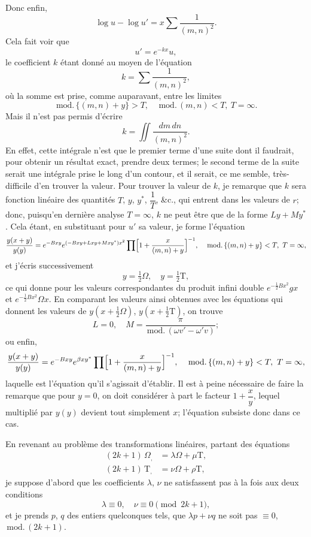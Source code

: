 \documentclass[11pt,a4paper]{article}
\providecommand{\md}{\,\mathrm{mod.}\,}
\begin{document}
Donc enfin,
\[
\log u - \log u' = x \sum \frac{1}{(m, n)^2}.
\]
Cela fait voir que
\[
u' = e^{-kx} u,
\]
le coefficient $k$ \'etant donn\'e au moyen de l'\'equation
\[
k = \sum \frac{1}{(m, n)^2},
\]
o\`u la somme est prise, comme auparavant, entre les limites
\[
\md\{(m, n) + y\} > T,\quad \md(m, n) < T,\ T = \infty.
\]
Mais il n'est pas permis d'\'ecrire
\[
k = \iint \frac{dm\,dn}{(m, n)^2}.
\]
En effet, cette int\'egrale n'est que le premier terme d'une suite dont il faudrait, pour obtenir un r\'esultat exact, prendre deux termes; le second terme de la suite serait une int\'egrale prise le long d'un contour, et il serait, ce me semble, tr\`es-difficile d'en trouver la valeur. Pour trouver la valeur de $k$, je remarque que $k$ sera fonction lin\'eaire des quantit\'es $T$, $y$, $y^*$, $\dfrac{1}{T}$, \&c., qui entrent dans les valeurs de $r$; donc, puisqu'en derni\`ere analyse $T = \infty$, $k$ ne peut \^etre que de la forme $L y + M y^*$. Cela \'etant, en substituant pour $u'$ sa valeur, je forme l'\'equation
\[
\frac{y(x + y)}{y(y)} = e^{-Bxy} e^{(-Bxy + Lxy + Mxy^*) x^2} \prod\Bigl[1 + \frac{x}{(m, n) + y}\Bigr]^{-1},\quad \md\{(m, n) + y\} < T,\ T = \infty,
\]
et j'\'ecris successivement
\[ y = \tfrac{1}{2}\Omega,\quad y = \tfrac{1}{2}\mathrm{T}, \]
ce qui donne pour les valeurs correspondantes du produit infini double $e^{-\frac{1}{2}Bx^2} g x$ et $e^{-\frac{1}{2}Bx^2} \Omega x$. En comparant les valeurs ainsi obtenues avec les \'equations qui donnent les valeurs de $y(x + \tfrac{1}{2}\Omega)$, $y(x + \tfrac{1}{2}\mathrm{T})$, on trouve
\[
L = 0,\quad M = \frac{\pi}{\md(\omega v' - \omega' v)};
\]
ou enfin,
\[
\frac{y(x + y)}{y(y)} = e^{-Bxy} e^{\beta x y^*} \prod\Bigl[1 + \frac{x}{(m, n) + y}\Bigr]^{-1},\quad \md\{(m, n) + y\} < T,\ T = \infty,
\]
laquelle est l'\'equation qu'il s'agissait d'\'etablir. Il est \`a peine n\'ecessaire de faire la remarque que pour $y = 0$, on doit consid\'erer \`a part le facteur $1 + \dfrac{x}{y}$, lequel multipli\'e par $y(y)$ devient tout simplement $x$; l'\'equation subsiste donc dans ce cas.

\medskip

En revenant au probl\`eme des transformations lin\'eaires, partant des \'equations
\begin{align*}
(2k+1)\,\Omega_{,} &= \lambda\Omega + \mu\mathrm{T},\\
(2k+1)\,\mathrm{T}_{,} &= \nu\Omega + \rho\mathrm{T},
\end{align*}
je suppose d'abord que les coefficients $\lambda$, $\nu$ ne satisfassent pas \`a la fois aux deux conditions
\[ \lambda \equiv 0,\quad \nu \equiv 0 \pmod{2k+1}, \]
et je prends $p$, $q$ des entiers quelconques tels, que $\lambda p + \nu q$ ne soit pas $\equiv 0$, $\md(2k+1)$.
\end{document}

